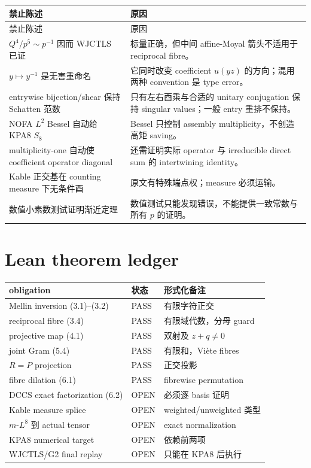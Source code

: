 \documentclass[11pt,a4paper]{ctexart}
\theoremstyle{definition}
\newcommand{\1}{\mathbf 1}
\newcommand{\OPEN}{\textcolor{red!70!black}{\textsf{OPEN}}}
\newcommand{\PASS}{\textcolor{green!45!black}{\textsf{PASS}}}
\begin{document}
\begin{longtable}{p{}p{}}
\toprule
禁止陈述 & 原因\\
\midrule
\endfirsthead
\toprule
禁止陈述 & 原因\\
\midrule
\endhead
$Q^4/p^5\sim p^{-1}$ 因而 WJCTLS 已证
& 标量正确，但中间 affine-Moyal 箭头不适用于 reciprocal fibre。\\
$y\mapsto y^{-1}$ 是无害重命名
& 它同时改变 coefficient $u(yz)$ 的方向；混用两种 convention 是 type error。\\
entrywise bijection/shear 保持 Schatten 范数
& 只有左右酉乘与合适的 unitary conjugation 保持 singular values；一般 entry
重排不保持。\\
NOFA $L^2$ Bessel 自动给 KPA8 $S_8$
& Bessel 只控制 assembly multiplicity，不创造高矩 saving。\\
multiplicity-one 自动使 coefficient operator diagonal
& 还需证明实际 operator 与 irreducible direct sum 的 intertwining identity。\\
Kable 正交基在 counting measure 下无条件酉
& 原文有特殊端点权；measure 必须运输。\\
数值小素数测试证明渐近定理
& 数值测试只能发现错误，不能提供一致常数与所有 $p$ 的证明。\\
\bottomrule
\end{longtable}

\section{Lean theorem ledger}

\begin{center}
\begin{tabular}{p{}p{}p{}}
\toprule
obligation & 状态 & 形式化备注\\
\midrule
Mellin inversion (3.1)--(3.2) & \PASS & 有限字符正交\\
reciprocal fibre (3.4) & \PASS & 有限域代数，分母 guard\\
projective map (4.1) & \PASS & 双射及 $z+q\ne0$\\
joint Gram (5.4) & \PASS & 有限和，Vi\`ete fibres\\
$R=P$ projection & \PASS & 正交投影\\
fibre dilation (6.1) & \PASS & fibrewise permutation\\
DCCS exact factorization (6.2) & \OPEN & 必须逐 basis 证明\\
Kable measure splice & \OPEN & weighted/unweighted 类型\\
$m$-$L^8$ 到 actual tensor & \OPEN & exact normalization\\
KPA8 numerical target & \OPEN & 依赖前两项\\
WJCTLS/G2 final replay & \OPEN & 只能在 KPA8 后执行\\
\bottomrule
\end{tabular}
\end{center}
\end{document}
